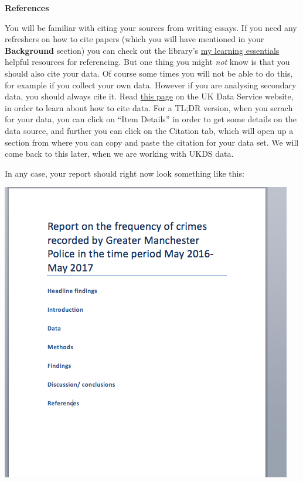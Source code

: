 \documentclass[
]{book}
\begin{document}
\textbf{References}

You will be familiar with citing your sources from writing essays. If you need any refreshers on how to cite papers (which you will have mentioned in your \textbf{Background} section) you can check out the library's \href{http://www.library.manchester.ac.uk/using-the-library/students/training-and-skills-support/my-learning-essentials/online-resources/?level=3\&level1Link=2\&level2Links=referencing,}{my learning essentials} helpful resources for referencing. But one thing you might \emph{not} know is that you should also cite your data. Of course some times you will not be able to do this, for example if you collect your own data. However if you are analysing secondary data, you should always cite it. Read \href{https://www.ukdataservice.ac.uk/use-data/citing-data}{this page} on the UK Data Service website, in order to learn about how to cite data. For a TL;DR version, when you serach for your data, you can click on ``Item Details'' in order to get some details on the data source, and further you can click on the Citation tab, which will open up a section from where you can copy and paste the citation for your data set. We will come back to this later, when we are working with UKDS data.

In any case, your report should right now look something like this:

\includegraphics{imgs/writeup_outline.png}
\end{document}
